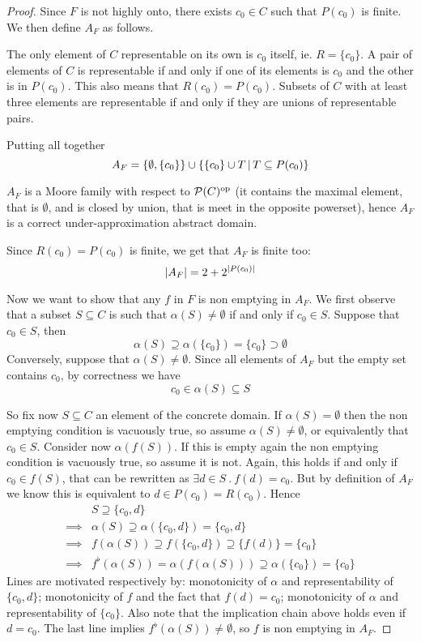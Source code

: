 \begin{proof}
	Since $F$ is not highly onto, there exists $c_0 \in C$ such that $P(c_0)$ is finite. We then define $A_F$ as follows.
	
	The only element of $C$ representable on its own is $c_0$ itself, ie. $R = \{ c_0 \}$.
	A pair of elements of $C$ is representable if and only if one of its elements is $c_0$ and the other is in $P(c_0)$. This also means that $R(c_0) = P(c_0)$.
	Subsets of $C$ with at least three elements are representable if and only if they are unions of representable pairs.
	
	Putting all together
	\[
	A_F = \{ \emptyset, \{ c_0 \} \} \cup \{ \{ c_0 \} \cup T \,\vert\, T \subseteq P(c_0) \}
	\]
	
	$A_F$ is a Moore family with respect to $\mathcal{P}(C)^{\text{op}}$ (it contains the maximal element, that is $\emptyset$, and is closed by union, that is meet in the opposite powerset), hence $A_F$ is a correct under-approximation abstract domain.
	
	Since $R(c_0) = P(c_0)$ is finite, we get that $A_F$ is finite too:
	\[
	\lvert A_F\rvert = 2 + 2^{\lvert P(c_0)\rvert}
	\]
	
	Now we want to show that any $f$ in $F$ is non emptying in $A_F$.
	We first observe that a subset $S \subseteq C$ is such that $\alpha(S) \neq \emptyset$ if and only if $c_0 \in S$. Suppose that $c_0 \in S$, then
	\[
	\alpha(S) \supseteq \alpha(\{ c_0 \}) = \{ c_0 \} \supset \emptyset
	\]
	Conversely, suppose that $\alpha(S) \neq \emptyset$. Since all elements of $A_F$ but the empty set contains $c_0$, by correctness we have
	\[
	c_0 \in \alpha(S) \subseteq S
	\]
	
	So fix now $S \subseteq C$ an element of the concrete domain. If $\alpha(S) = \emptyset$ then the non emptying condition is vacuously true, so assume $\alpha(S) \neq \emptyset$, or equivalently that $c_0 \in S$.
	Consider now $\alpha(f(S))$. If this is empty again the non emptying condition is vacuously true, so assume it is not. Again, this holds if and only if $c_0 \in f(S)$, that can be rewritten as $\exists d \in S\ .\ f(d) = c_0$. But by definition of $A_F$ we know this is equivalent to $d \in P(c_0) = R(c_0)$.
	Hence
	\begin{align*}
		&S \supseteq \{ c_0, d \} \\
		\implies& \alpha(S) \supseteq \alpha(\{ c_0, d \}) = \{ c_0, d \} \\
		\implies& f(\alpha(S)) \supseteq f(\{ c_0, d \}) \supseteq \{ f(d) \} = \{ c_0 \} \\
		\implies& f^{\flat}(\alpha(S)) = \alpha(f(\alpha(S))) \supseteq \alpha(\{ c_0 \}) = \{ c_0 \}
	\end{align*}
	Lines are motivated respectively by: monotonicity of $\alpha$ and representability of $\{ c_0, d \}$; monotonicity of $f$ and the fact that $f(d) = c_0$; monotonicity of $\alpha$ and representability of $\{ c_0 \}$. Also note that the implication chain above holds even if $d = c_0$.
	The last line implies $f^{\flat}(\alpha(S)) \neq \emptyset$, so $f$ is non emptying in $A_F$.
\end{proof}

